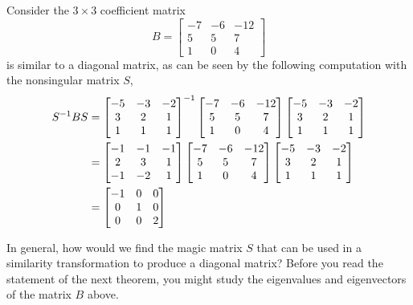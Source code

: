 \documentclass{ximera}
\begin{document}
\begin{example}
Consider the $3\times 3$ coefficient matrix
\[
B=\begin{bmatrix}
-7&-6&-12\\
 5&5&7\\
 1&0&4
\end{bmatrix}
\]
is similar to a diagonal matrix, as can be seen by the following computation with the nonsingular matrix $S$,
\begin{align*}
S^{-1}BS&=
\begin{bmatrix}-5&-3&-2\\3&2&1\\1&1&1\end{bmatrix}^{-1}\begin{bmatrix}
-7&-6&-12\\
 5&5&7\\
 1&0&4
\end{bmatrix}\begin{bmatrix}-5&-3&-2\\3&2&1\\1&1&1\end{bmatrix}\\
&=\begin{bmatrix}-1&-1&-1\\2&3&1\\-1&-2&1\end{bmatrix}\begin{bmatrix}
-7&-6&-12\\
 5&5&7\\
 1&0&4
\end{bmatrix}\begin{bmatrix}-5&-3&-2\\3&2&1\\1&1&1\end{bmatrix}\\
&=
\begin{bmatrix}-1&0&0\\0&1&0\\0&0&2\end{bmatrix}
\end{align*}

\end{example}

In general, how would we find the magic matrix $S$ that can be used in a similarity transformation to produce a diagonal matrix?  Before you read the statement of the next theorem, you might study the eigenvalues and eigenvectors of the matrix $B$ above.
\end{document}
